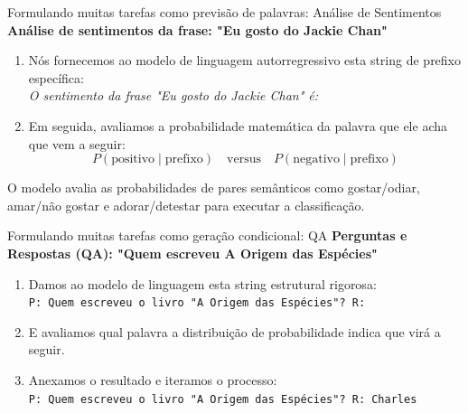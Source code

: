 \documentclass[aspectratio=169]{beamer}
\begin{document}
\begin{frame}{Formulando muitas tarefas como previsão de palavras: Análise de Sentimentos}\justifying
    \textbf{Análise de sentimentos da frase: "Eu gosto do Jackie Chan"}
    
    \begin{enumerate}
        \item Nós fornecemos ao modelo de linguagem autorregressivo esta string de prefixo específica: \\
        \textit{O sentimento da frase "Eu gosto do Jackie Chan" é:}
        \item Em seguida, avaliamos a probabilidade matemática da palavra que ele acha que vem a seguir: \\
        \[ P(\text{positivo} \mid \text{prefixo}) \quad \text{versus} \quad P(\text{negativo} \mid \text{prefixo}) \]
    \end{enumerate}
    O modelo avalia as probabilidades de pares semânticos como gostar/odiar, amar/não gostar e adorar/detestar para executar a classificação.
\end{frame}

\begin{frame}{Formulando muitas tarefas como geração condicional: QA}\justifying
    \textbf{Perguntas e Respostas (QA): "Quem escreveu A Origem das Espécies"}
    
    \begin{enumerate}
        \item Damos ao modelo de linguagem esta string estrutural rigorosa: \\
        \texttt{P: Quem escreveu o livro "A Origem das Espécies"? R:}
        \item E avaliamos qual palavra a distribuição de probabilidade indica que virá a seguir.
        \item Anexamos o resultado e iteramos o processo: \\
        \texttt{P: Quem escreveu o livro "A Origem das Espécies"? R: Charles}
    \end{enumerate}
\end{frame}
\end{document}
